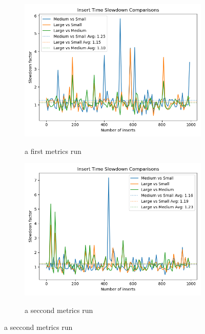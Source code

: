 \begin{figure}[H]
\centering
\caption{ }
\begin{subfigure}[b]{0.48\textwidth}
    \centering
    \caption{a first metrics run}
    \includegraphics[width=\textwidth]{./images/Profiler-insert-slowdown-01.png}
    \label{fig:insertVsSize01}
\end{subfigure}
\hfill
\begin{subfigure}[b]{0.48\textwidth}
    \centering
    \caption{a seccond metrics run}
    \includegraphics[width=\textwidth]{./images/Profiler-insert-slowdown-02.png}
    \label{fig:insertVsSize02}
\end{subfigure}
\end{figure}


